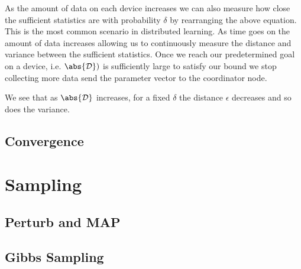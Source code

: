 As the amount of data on each device increases we can also measure how close the sufficient statistics are with probability $\delta$ by rearranging the above equation. 
This is the most common scenario in distributed learning. As time goes on the amount of data increases allowing us to continuously measure the distance and variance between the sufficient statistics.
Once we reach our predetermined goal on a device, i.e. $\abs{\mathcal{D}}^^i$ is sufficiently large to satisfy our bound we stop collecting more data send the parameter vector to the coordinator node.


We see that as $\abs{\mathcal{D}}$ increases, for a fixed $\delta$ the distance $\epsilon$ decreases and so does the variance. 

\subsection{Convergence}
\section{Sampling}
\subsection{Perturb and MAP}
\label{ssec:pmap}
\subsection{Gibbs Sampling}
